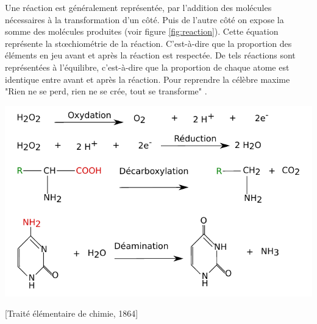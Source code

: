 \begin{refsegment}
    Une réaction est généralement représentée, par l’addition des molécules nécessaires à la transformation d’un côté. Puis de l’autre côté on expose la somme des molécules produites (voir figure \ref{fig:reaction}). Cette équation  représente la stœchiométrie de la réaction. C’est-à-dire que la proportion des éléments en jeu avant et après la réaction est respectée. De tels réactions sont représentées à l'équilibre, c'est-à-dire que la proportion de chaque atome est identique entre avant et après la réaction. Pour reprendre la célèbre maxime "Rien ne se perd, rien ne se crée, tout se transforme" .
    
    \begin{shadedfigure}
        \centering
        \includegraphics[width=\textwidth]{img/equation_reaction.pdf}
        \caption{Représentation de réaction sous leur forme "équation-bilan" .}
        \label{fig:reaction}
    \end{shadedfigure}
    
    [Traité élémentaire de chimie, 1864]
    
    

\end{refsegment}
